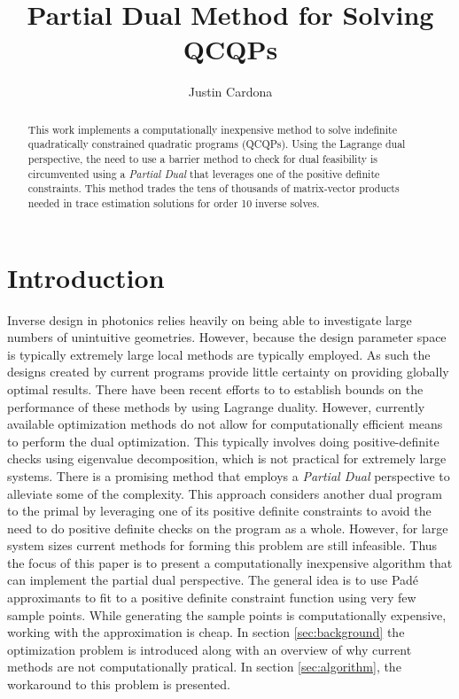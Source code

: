 \documentclass[reprint]{revtex4-2}
\begin{document}
\title{Partial Dual Method for Solving QCQPs}
\author{Justin Cardona}
\begin{abstract}
This work implements a computationally inexpensive method to solve indefinite quadratically constrained quadratic programs (QCQPs). Using the Lagrange dual perspective, the need to use a barrier method to check for dual feasibility is circumvented using a \textit{Partial Dual} that leverages one of the positive definite constraints. This method trades the tens of thousands of matrix-vector products needed in trace estimation solutions for order 10 inverse solves.
\end{abstract}
\maketitle


\section{Introduction}
\label{sec:introduction}

Inverse design in photonics relies heavily on being able to investigate large numbers of unintuitive geometries. However, because the design parameter space is typically extremely large local methods are typically employed. As such the designs created by current programs provide little certainty on providing globally optimal results. There have been recent efforts to to establish bounds on the performance of these methods by using Lagrange duality. However, currently available optimization methods do not allow for computationally efficient means to perform the dual optimization\cite{molesky2020global}. This typically involves doing positive-definite checks using eigenvalue decomposition, which is not practical for extremely large systems. There is a promising method \cite{molesky2020hierarchical} that employs a \textit{Partial Dual} perspective to alleviate some of the complexity. This approach considers another dual program to the primal by leveraging one of its positive definite constraints to avoid the need to do positive definite checks on the program as a whole. However, for large system sizes current methods for forming this problem are still infeasible. Thus the focus of this paper is to present a computationally inexpensive algorithm that can implement the partial dual perspective. The general idea is to use Padé approximants to fit to a positive definite constraint function using very few sample points. While generating the sample points is computationally expensive, working with the approximation is cheap. In section \ref{sec:background} the optimization problem is introduced along with an overview of why current methods are not computationally pratical. In section \ref{sec:algorithm}, the workaround to this problem is presented.
\end{document}
